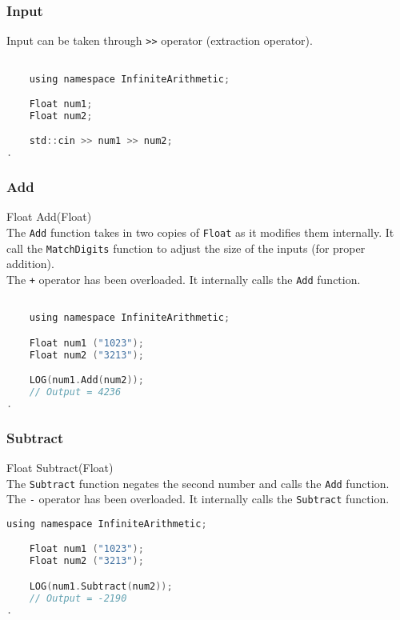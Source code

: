\subsubsection{Input}
Input can be taken through \verb|>>| operator (extraction operator). 
\vspace*{1em}
\begin{lstlisting}[language = C]	

	using namespace InfiniteArithmetic;

	Float num1;
	Float num2;

	std::cin >> num1 >> num2;
.
\end{lstlisting}
\vspace*{1em}

\subsubsection{Add}
{\ttfamily \large Float Add(Float)} \\[2mm]
The \verb|Add| function takes in two copies of \verb|Float| as it modifies them internally. It call the \verb|MatchDigits| function to adjust the size of the inputs (for proper addition). \\
The \verb|+| operator has been overloaded. It internally calls the \verb|Add| function.
\vspace*{1em}
\begin{lstlisting}[language = C]	

	using namespace InfiniteArithmetic;

	Float num1 ("1023");
	Float num2 ("3213");

	LOG(num1.Add(num2));
	// Output = 4236
.
\end{lstlisting}
\vspace*{1em}

\subsubsection{Subtract}
{\ttfamily \large Float Subtract(Float)} \\[2mm]
The \verb|Subtract| function negates the second number and calls the \verb|Add| function. \\
The \verb|-| operator has been overloaded. It internally calls the \verb|Subtract| function.
\vspace*{1em}
\begin{lstlisting}[language = C]	
	using namespace InfiniteArithmetic;

	Float num1 ("1023");
	Float num2 ("3213");

	LOG(num1.Subtract(num2));
	// Output = -2190
.
\end{lstlisting}
\vspace*{1em}


